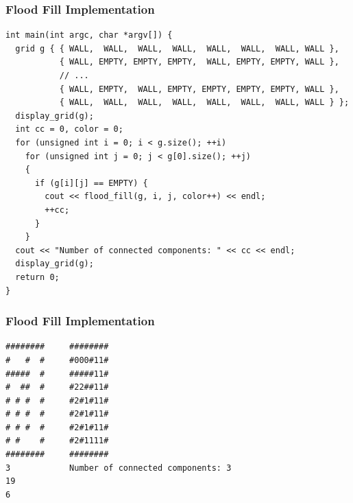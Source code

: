 \documentclass{beamer}
\newcommand{\spojlink}[2]{Sphere Online Judge (http://www.spoj.com)
  problem: \href{#2}{\textcolor{blue}{#1}.}}
\newcounter{exo}
\newcommand{\exo}{
  \addtocounter{exo}{1}
  Exercice \arabic{exo}
}
\begin{document}
\begin{frame}[containsverbatim]
\frametitle{Flood Fill Implementation}
\scriptsize
\begin{lstlisting}
int main(int argc, char *argv[]) {
  grid g { { WALL,  WALL,  WALL,  WALL,  WALL,  WALL,  WALL, WALL },
           { WALL, EMPTY, EMPTY, EMPTY,  WALL, EMPTY, EMPTY, WALL },
           // ...
           { WALL, EMPTY,  WALL, EMPTY, EMPTY, EMPTY, EMPTY, WALL },
           { WALL,  WALL,  WALL,  WALL,  WALL,  WALL,  WALL, WALL } };
  display_grid(g);
  int cc = 0, color = 0;
  for (unsigned int i = 0; i < g.size(); ++i)
    for (unsigned int j = 0; j < g[0].size(); ++j)
    {
      if (g[i][j] == EMPTY) {
        cout << flood_fill(g, i, j, color++) << endl;
        ++cc;
      }
    }
  cout << "Number of connected components: " << cc << endl;
  display_grid(g);
  return 0;
}
\end{lstlisting}

\end{frame}

\begin{frame}[containsverbatim]
\frametitle{Flood Fill Implementation}
\scriptsize
\begin{verbatim}
########     ########
#   #  #     #000#11#
#####  #     #####11#
#  ##  #     #22##11#
# # #  #     #2#1#11#
# # #  #     #2#1#11#
# # #  #     #2#1#11#
# #    #     #2#1111#
########     ########
3            Number of connected components: 3
19
6
\end{verbatim}

\end{frame}



\ifanswers
\end{document}

